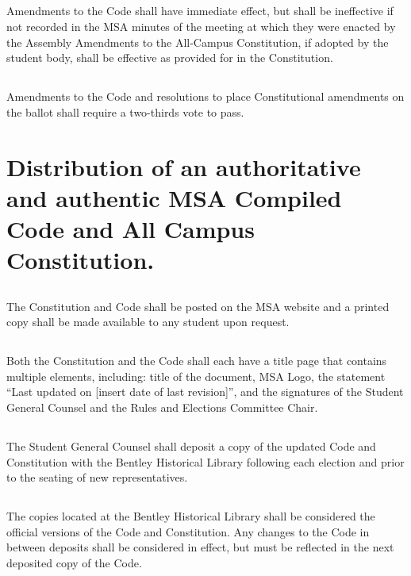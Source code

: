 \subsection{}
Amendments to the Code shall have immediate effect, but shall be ineffective if not recorded in the MSA minutes of the meeting at which they were enacted by the Assembly Amendments to the All-Campus Constitution, if adopted by the student body, shall be effective as provided for in the Constitution.

\subsection{}
Amendments to the Code and resolutions to place Constitutional amendments on the ballot shall require a two-thirds vote to pass. 

\section{Distribution of an authoritative and authentic MSA Compiled Code and All Campus Constitution.}  

\subsection{}
The Constitution and Code shall be posted on the MSA website and a printed copy shall be made available to any student upon request.

\subsection{}
Both the Constitution and the Code shall each have a title page that contains multiple elements, including: title of the document, MSA Logo, the statement ``Last updated on [insert date of last revision]'', and the signatures of the Student General Counsel and the Rules and Elections Committee Chair.

\subsection{}
The Student General Counsel shall deposit a copy of the updated Code and Constitution with the Bentley Historical Library following each election and prior to the seating of new representatives.

\subsection{}
The copies located at the Bentley Historical Library shall be considered the official versions of the Code and Constitution. Any changes to the Code in between deposits shall be considered in effect, but must be reflected in the next deposited copy of the Code.


